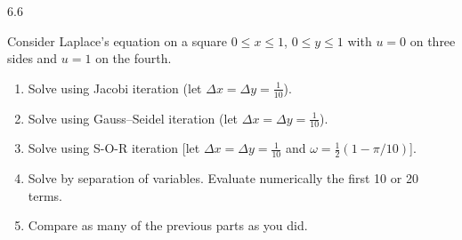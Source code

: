 \begin{exercises}{6.6}
\item Consider Laplace's equation on a square $0 \le x \le 1$, $0 \le y \le 1$ with $u = 0$ on three sides and $u = 1$ on the fourth.
\begin{enumerate}
\item[(a)] Solve using Jacobi iteration (let $\Delta x = \Delta y = \frac{1}{10}$).
\item[(b)] Solve using Gauss--Seidel iteration (let $\Delta x = \Delta y = \frac{1}{10}$).
\item[(c)] Solve using S-O-R iteration [let $\Delta x = \Delta y = \frac{1}{10}$ and $\omega = \frac{1}{2}(1 - \pi/10)$].
\item[(d)] Solve by separation of variables.  Evaluate numerically the first 10 or 20 terms.
\item[(e)] Compare as many of the previous parts as you did.
\end{enumerate}
\end{exercises}
